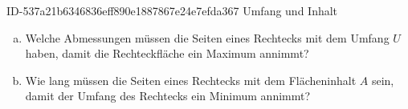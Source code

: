\begin{exercise}
      {ID-537a21b6346836eff890e1887867e24e7efda367}
      {Umfang und Inhalt}
  \ifproblem\problem
    \begin{enumerate}[a)]
      \item Welche Abmessungen müssen die Seiten eines Rechtecks mit dem
            Umfang $U$ haben, damit die Rechteckfläche ein Maximum annimmt?
      \item Wie lang müssen die Seiten eines Rechtecks mit dem Flächeninhalt
            $A$ sein, damit der Umfang des Rechtecks ein Minimum annimmt?
    \end{enumerate}
  \fi
\end{exercise}
